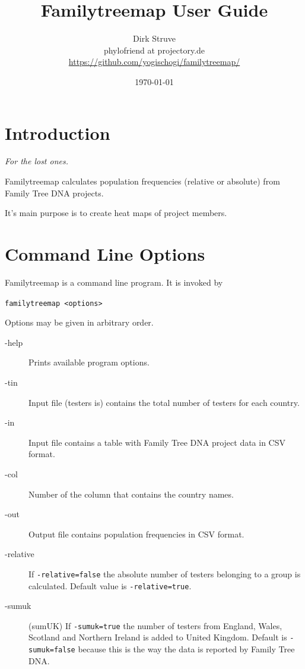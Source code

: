 \documentclass[12pt,a4paper]{article}
\begin{document}
\title{Familytreemap User Guide}
\author{Dirk Struve\\
phylofriend at projectory.de\\
\href{https://github.com/yogischogi/familytreemap/}{https://github.com/yogischogi/familytreemap/}}
\date{\today}
\maketitle
\tableofcontents


\section{Introduction}

\hfill {\sl For the lost ones.}
\vspace{1em}

\noindent
Familytreemap calculates population frequencies
(relative or absolute) from Family Tree DNA projects.

It's main purpose is to create heat maps of project members.


\section{Command Line Options}

Familytreemap is a command line program. It is invoked by

\vspace{1em}
\noindent\texttt{familytreemap <options>}

\vspace{1em}
\noindent Options may be given in arbitrary order.

\begin{description}
\item[-help] Prints available program options.
\item[-tin] Input file (testers is) contains the total
  number of testers for each country.
\item[-in] Input file contains a table with Family Tree DNA
  project data in CSV format.
\item[-col] Number of the column that contains the country names.
\item[-out] Output file contains population frequencies in
  CSV format.
\item[-relative] If \texttt{-relative=false} the absolute
  number of testers belonging to a group is calculated.
  Default value is \texttt{-relative=true}.
\item[-sumuk] (sumUK) If \texttt{-sumuk=true} the number of
  testers from England, Wales, Scotland and Northern Ireland
  is added to United Kingdom. Default is \texttt{-sumuk=false}
  because this is the way the data is reported by Family Tree DNA.
\end{description}
\end{document}
